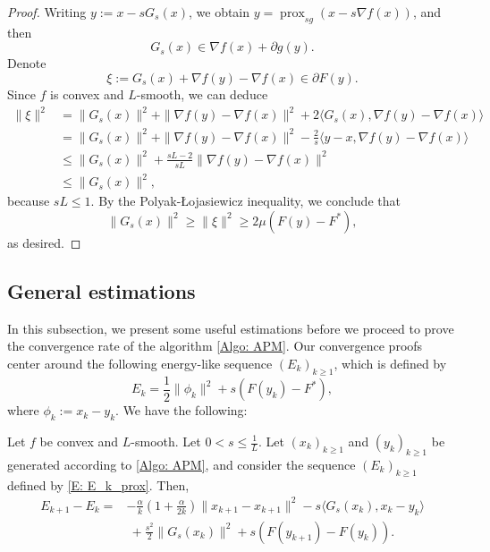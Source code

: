 \documentclass[onefignum,onetabnum]{siamart220329}
\DeclareMathOperator{\prox}{prox}
\begin{document}
\begin{proof}
Writing $y:=x-sG_s(x)$, we obtain $y = \prox_{sg}(x-s\nabla f(x))$, and then
$$ G_s(x) \in \nabla f(x) + \partial g(y). $$
Denote 
$$\xi := G_s(x) + \nabla f(y) - \nabla f(x)\in\partial F(y).$$
Since $f$ is convex and $L$-smooth, we can deduce
\begin{align*}
\| \xi \|^2
&= \| G_s(x) \|^2 + \| \nabla f(y) - \nabla f(x) \|^2 + 2 \langle G_s(x), \nabla f(y) - \nabla f(x)\rangle \\
&= \| G_s(x) \|^2 + \| \nabla f(y) - \nabla f(x) \|^2 - \frac{2}{s} \langle y-x, \nabla f(y) - \nabla f(x)\rangle \\
&\le \| G_s(x) \|^2 + \frac{sL-2}{sL}\| \nabla f(y) - \nabla f(x) \|^2 \\
&\le \| G_s(x) \|^2,
\end{align*}
because $sL\le 1$. By the Polyak-\L ojasiewicz inequality, we conclude that
$$  \| G_s(x) \|^2 \ge\| \xi \|^2 \ge 2\mu \left( F(y) - F^* \right), $$
as desired.
\end{proof}





\subsection{General estimations}
In this subsection, we present some useful estimations before we proceed to prove the convergence rate of the algorithm \eqref{Algo: APM}. Our convergence proofs center around the following energy-like sequence $(E_k)_{k\ge 1}$, which is defined by
\begin{equation}\label{E: E_k_prox}
E_k = \frac{1}{2}\| \phi_k \|^2 + s\left( F(y_k) - F^* \right),
\end{equation} 
where $\phi_k:= x_k - y_k$. We have the following:  


\begin{proposition}\label{P: E_k_bound_prox}
Let $f$ be convex and $L$-smooth. Let $0 < s \le \frac{1}{L}$. Let $(x_k)_{k\ge 1}$ and $(y_k)_{k\ge 1}$ be generated according to \eqref{Algo: APM}, and consider the sequence $(E_k)_{k\ge 1}$ defined by \eqref{E: E_k_prox}. Then, 
\begin{align*}
E_{k+1} - E_k
    =& - \frac{\alpha}{k}\left(1+\frac{\alpha}{2k}\right)\| x_{k+1} - x_{k+1} \|^2
   - s\langle G_s(x_k), x_k - y_k \rangle  \\
   &\ + \frac{s^2}{2} \| G_s(x_k) \|^2 + s\left( F(y_{k+1}) - F(y_k) \right).
\end{align*}
\end{proposition}
\end{document}
